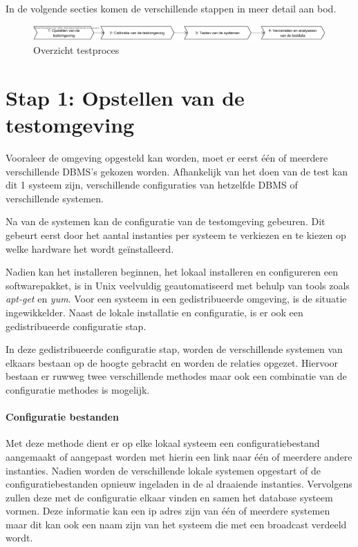 In de volgende secties komen de verschillende stappen in meer detail aan bod.  
\begin{figure}[ht!]
\centering
\includegraphics[width=\linewidth]{img/Test-Process-Overview}
\caption{Overzicht testproces}
\label{fig:test-process-overview}
\end{figure}

\section{Stap 1: Opstellen van de testomgeving}
Vooraleer de omgeving opgesteld kan worden, moet er eerst één of meerdere  verschillende DBMS's gekozen worden. Afhankelijk van het doen van de test kan dit 1 systeem zijn, verschillende configuraties van hetzelfde DBMS of verschillende systemen. 

Na van de systemen kan de configuratie van de testomgeving gebeuren. Dit gebeurt eerst door het aantal instanties per systeem te verkiezen en te kiezen op welke hardware het wordt geïnstalleerd. 

Nadien kan het installeren beginnen, het lokaal installeren en configureren een softwarepakket, is in Unix veelvuldig geautomatiseerd met behulp van tools zoals \textit{apt-get} en \textit{yum}. Voor een systeem in een gedistribueerde omgeving, is de situatie ingewikkelder. Naast de lokale installatie en configuratie, is er ook een gedistribueerde configuratie stap.  

In deze gedistribueerde configuratie stap, worden de verschillende systemen van elkaars bestaan op de hoogte gebracht en worden de relaties opgezet. Hiervoor bestaan er ruwweg twee verschillende methodes maar ook een combinatie van de configuratie methodes is mogelijk.
 
\paragraph{Configuratie bestanden} Met deze methode dient er op elke lokaal systeem een configuratiebestand aangemaakt of aangepast worden met hierin een link naar één of meerdere andere instanties. Nadien worden de verschillende lokale systemen opgestart of de configuratiebestanden opnieuw ingeladen in de al draaiende instanties. Vervolgens zullen deze met de configuratie elkaar vinden en samen het database systeem vormen. Deze informatie kan een ip adres zijn van één of meerdere systemen maar dit kan ook een naam zijn van het systeem die met een broadcast verdeeld wordt. 
